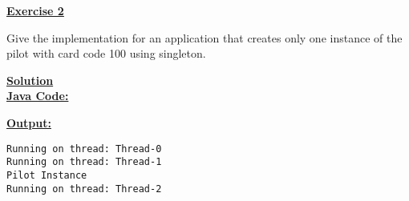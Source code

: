 \newpage
\begin{center}
    \Huge{\textbf{\underline{Exercise 2}}}
\end{center}

\vspace{0.45cm}

Give the implementation for an application that creates only one
instance of the pilot with card code 100 using singleton.

\vspace{0.75cm}

\textbf{\underline{Solution}}\\[0.15cm]
\textbf{\underline{Java Code:}}
\vspace{0.1cm}


\vspace{0.5cm}


\vspace{1cm}

\textbf{\underline{Output:}}
\vspace{0.1cm}
\begin{lstlisting}[style=cmd]
Running on thread: Thread-0
Running on thread: Thread-1
Pilot Instance
Running on thread: Thread-2
\end{lstlisting}



